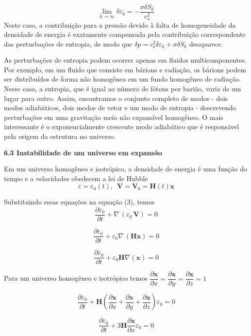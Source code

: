 \documentclass[a4paper,12pt]{article}
\begin{document}
$$\lim_{k \to\infty}\delta\varepsilon_k =-\dfrac{ \sigma \delta S_k}{c^2_s}$$
Neste caso, a contribuição para a pressão devido à falta de homogeneidade da densidade de energia é exatamente compensada pela contribuição correspondente das perturbações de entropia, de modo que $\delta p = c_s^2 \delta\varepsilon_k + \sigma\delta S_k$ desaparece. 

As perturbações de entropia podem ocorrer apenas em fluidos multicomponentes. Por exemplo, em um fluido que consiste em bárions e radiação, os bárions podem ser distribuídos de forma não homogênea em um fundo homogêneo de radiação. Nesse caso, a entropia, que é igual ao número de fótons por barião, varia de um lugar para outro.
Assim, encontramos o conjunto completo de modos - dois modos adiabáticos, dois
modos de vetor e um modo de entropia - descrevendo perturbações em uma gravitação
meio não expansível homogêneo. O mais interessante é o exponencialmente
crescente modo adiabático que é responsável pela origem da estrutura no
universo.

\begin{center}
	\textbf{6.3 Instabilidade de um universo em expansão}
\end{center}

Em um universo homogêneo e isotrópico, a densidade de energia é uma função do tempo e a velocidades obedecem a lei de Hubble
\begin{equation}
	\varepsilon = \varepsilon_0 (t), \,\,\, \mathbf{V} = \mathbf{V}_0 = \mathbf{H} (t) \mathbf{x}
\end{equation}

Substituindo essas equações na equação (3), temos
$$\dfrac{\partial \varepsilon_0}{\partial t} +\nabla \,(\varepsilon_0 \, \textbf{V}) = 0$$

$$\dfrac{\partial \varepsilon_0}{\partial t} +\varepsilon_0\nabla \,( \mathbf{H} \mathbf{x}) = 0$$

$$\dfrac{\partial \varepsilon_0}{\partial t} +\varepsilon_0\mathbf{H}\nabla(\mathbf{x}) = 0$$

Para um universo homogêneo e isotrópico temos $\dfrac{\partial\mathbf{x}}{\partial x}=\dfrac{\partial\mathbf{x}}{\partial y} =\dfrac{\partial\mathbf{x}}{\partial z} = 1$

$$\dfrac{\partial \varepsilon_0}{\partial t} +\mathbf{H}\left(\dfrac{\partial\mathbf{x}}{\partial x}+\dfrac{\partial\mathbf{x}}{\partial y} +\dfrac{\partial\mathbf{x}}{\partial z} \right)\varepsilon_0 = 0$$

$$\dfrac{\partial \varepsilon_0}{\partial t} +3\mathbf{H} \dfrac{\partial\mathbf{x}}{\partial x}\varepsilon_0= 0$$
\end{document}
